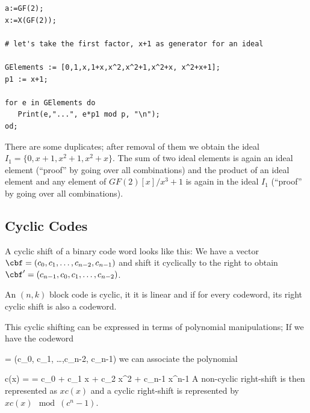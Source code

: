 \begin{verbatim}
a:=GF(2);
x:=X(GF(2));

# let's take the first factor, x+1 as generator for an ideal

GElements := [0,1,x,1+x,x^2,x^2+1,x^2+x, x^2+x+1];
p1 := x+1;

for e in GElements do
   Print(e,"...", e*p1 mod p, "\n");
od;
\end{verbatim}

There are some duplicates; after removal of them we obtain the ideal $I_1 = \{0, x+1, x^2+1, x^2+x\}$. The sum of two ideal elements is again an ideal element (``proof'' by going over all combinations) and the product of an ideal element and any element of $GF(2)[x]/x^3+1$ is again in the ideal $I_1$ (``proof'' by going over all combinations).

\subsection{Cyclic Codes}

A cyclic shift of a binary code word looks like this: We have a vector $\cbf = (c_0, c_1, \ldots,c_{n-2}, c_{n-1})$ and shift it cyclically to the right to obtain $\cbf' = (c_{n-1}, c_0, c_1, \ldots, c_{n-2})$.

\begin{definition}
  An $(n,k)$ block code is cyclic, it it is linear and if for every codeword, its right cyclic shift is also a codeword.
\end{definition}


This cyclic shifting can be expressed in terms of polynomial manipulations; If we have the codeword

\bee
\cbf = (c_0, c_1, \ldots,c_{n-2}, c_{n-1})
\eee
%
we can associate the polynomial

\bee
c(x) = \cbf = c_0 + c_1 x + c_2 x^2 + \cdots c_{n-1} x^{n-1}
\eee
%
A non-cyclic right-shift is then represented as $xc(x)$ and a cyclic right-shift is represented by $xc(x) \mod (c^n-1)$.

